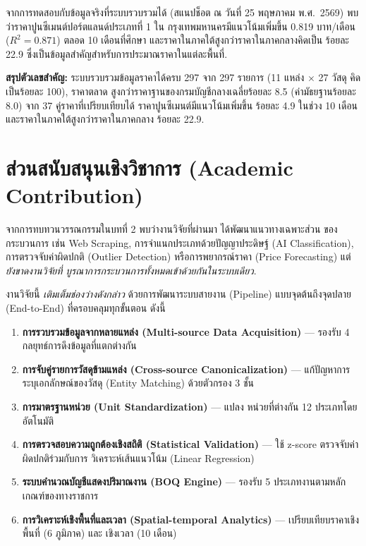 จากการทดสอบกับข้อมูลจริงที่ระบบรวบรวมได้ (สแนปช็อต ณ วันที่ 25
พฤษภาคม พ.ศ.\ 2569) พบว่าราคาปูนซีเมนต์ปอร์ตแลนด์ประเภทที่ 1 ใน
กรุงเทพมหานครมีแนวโน้มเพิ่มขึ้น 0.819 บาท/เดือน ($R^2 = 0.871$)
ตลอด 10 เดือนที่ศึกษา และราคาในภาคใต้สูงกว่าราคาในภาคกลางคิดเป็น
ร้อยละ 22.9 ซึ่งเป็นข้อมูลสำคัญสำหรับการประมาณราคาในแต่ละพื้นที่.

\textbf{สรุปตัวเลขสำคัญ:} ระบบรวบรวมข้อมูลราคาได้ครบ 297 จาก 297
รายการ (11 แหล่ง $\times$ 27 วัสดุ คิดเป็นร้อยละ 100), ราคาตลาด
สูงกว่าราคาฐานของกรมบัญชีกลางเฉลี่ยร้อยละ 8.5 (ค่ามัธยฐานร้อยละ 8.0)
จาก 37 คู่ราคาที่เปรียบเทียบได้ ราคาปูนซีเมนต์มีแนวโน้มเพิ่มขึ้น
ร้อยละ 4.9 ในช่วง 10 เดือน และราคาในภาคใต้สูงกว่าราคาในภาคกลาง
ร้อยละ 22.9.

\section{ส่วนสนับสนุนเชิงวิชาการ (Academic Contribution)}
\label{sec:contribution}

จากการทบทวนวรรณกรรมในบทที่ 2 พบว่างานวิจัยที่ผ่านมา
\cite{rao2015,chunyaem2019,liu2024,lee2024} ได้พัฒนาแนวทางเฉพาะส่วน
ของกระบวนการ เช่น Web Scraping, การจำแนกประเภทด้วยปัญญาประดิษฐ์
(AI Classification), การตรวจจับค่าผิดปกติ (Outlier Detection)
หรือการพยากรณ์ราคา (Price Forecasting) แต่ \emph{ยังขาดงานวิจัยที่
บูรณาการกระบวนการทั้งหมดเข้าด้วยกันในระบบเดียว}.

งานวิจัยนี้ \emph{เติมเต็มช่องว่างดังกล่าว} ด้วยการพัฒนาระบบสายงาน
(Pipeline) แบบจุดต้นถึงจุดปลาย (End-to-End) ที่ครอบคลุมทุกขั้นตอน
ดังนี้

\begin{enumerate}[leftmargin=2em,itemsep=0.2em]
  \item \textbf{การรวบรวมข้อมูลจากหลายแหล่ง (Multi-source Data
        Acquisition)} --- รองรับ 4 กลยุทธ์การดึงข้อมูลที่แตกต่างกัน
  \item \textbf{การจับคู่รายการวัสดุข้ามแหล่ง (Cross-source
        Canonicalization)} --- แก้ปัญหาการระบุเอกลักษณ์ของวัสดุ
        (Entity Matching) ด้วยตัวกรอง 3 ชั้น
  \item \textbf{การมาตรฐานหน่วย (Unit Standardization)} --- แปลง
        หน่วยที่ต่างกัน 12 ประเภทโดยอัตโนมัติ
  \item \textbf{การตรวจสอบความถูกต้องเชิงสถิติ (Statistical
        Validation)} --- ใช้ z-score ตรวจจับค่าผิดปกติร่วมกับการ
        วิเคราะห์เส้นแนวโน้ม (Linear Regression)
  \item \textbf{ระบบคำนวณบัญชีแสดงปริมาณงาน (BOQ Engine)} ---
        รองรับ 5 ประเภทงานตามหลักเกณฑ์ของทางราชการ
  \item \textbf{การวิเคราะห์เชิงพื้นที่และเวลา (Spatial-temporal
        Analytics)} --- เปรียบเทียบราคาเชิงพื้นที่ (6 ภูมิภาค) และ
        เชิงเวลา (10 เดือน)
\end{enumerate}

